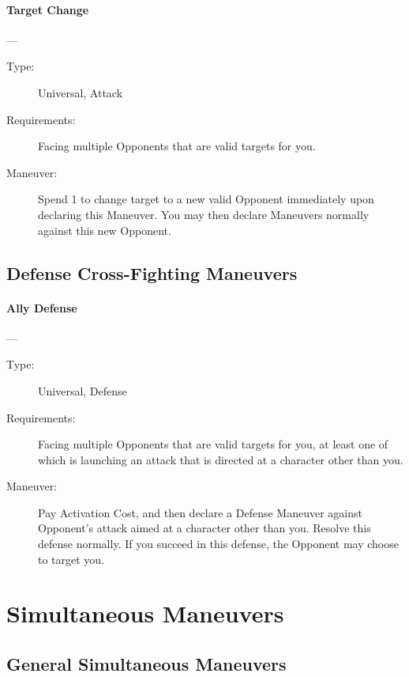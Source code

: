 \documentclass[oneside,11pt,english]{book}
\begin{document}
\paragraph{\large\label{man:Target Change}Target Change}---\quad{\large[1]}
\vspace{-10pt}\begin{description} 
\item [Type:] Universal, Attack 
\item [Requirements:] Facing multiple Opponents that are valid targets for you. 
\item [Maneuver:] Spend 1 to change target to a new valid Opponent immediately upon declaring this 
Maneuver. You may then declare Maneuvers normally against this new Opponent. 
\end{description}
\subsection{Defense Cross-Fighting Maneuvers}
\paragraph{\large\label{man:Ally Defense}Ally Defense}---\quad{\large[2]}
\vspace{-10pt}\begin{description} 
\item [Type:] Universal, Defense 
\item [Requirements:] Facing multiple Opponents that are valid targets for you, at least one of which is 
launching an attack that is directed at a character other than you. 
\item [Maneuver:] Pay Activation Cost, and then declare a Defense Maneuver against Opponent’s attack aimed 
at a character other than you. Resolve this defense normally. If you succeed in this defense, the Opponent 
may choose to target you. 
\end{description}

\section{Simultaneous Maneuvers}
\subsection{General Simultaneous Maneuvers}
\end{document}
